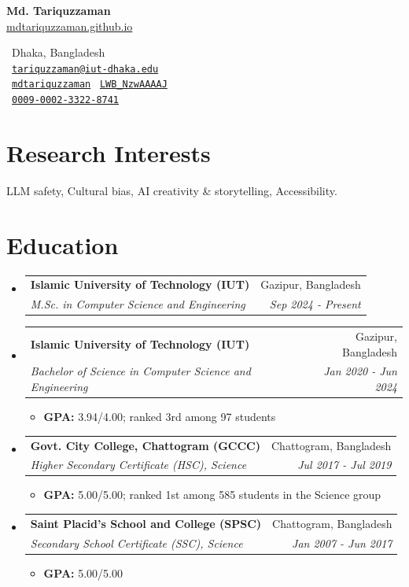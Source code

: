 \documentclass[letterpaper,11pt]{article}
\makeatletter
\newcommand{\cvEntry}[4]{\item
  \begin{tabular*}{\linewidth}{@{}l@{\extracolsep{\fill}}r@{}}
    \textbf{#1} & #2\\
    {\small\textit{#3}} & {\small\textit{#4}}
  \end{tabular*}}
\newenvironment{entries}{\vspace{-1.35pt}\begin{itemize}[leftmargin=14bp,label=\textbullet,itemsep=5.75pt,topsep=0pt,parsep=0pt]}{\end{itemize}}
\newenvironment{details}{\begin{itemize}[leftmargin=24bp,label=$\circ$,itemsep=2pt,topsep=4pt,parsep=0pt]\small}{\end{itemize}}
\makeatother
\begin{document}
\noindent
\begin{minipage}[t]{0.47\textwidth}
  \vspace{6.55bp}
  {\fontsize{20.74pt}{24pt}\selectfont\bfseries Md. Tariquzzaman}\\[3pt]
  \href{https://mdtariquzzaman.github.io}{mdtariquzzaman.github.io}
\end{minipage}\hfill
\begin{minipage}[t]{0.53\textwidth}
  \vspace{0pt}\raggedleft
  \ Dhaka, Bangladesh\\
  \ \href{mailto:tariquzzaman@iut-dhaka.edu}{\texttt{tariquzzaman@iut-dhaka.edu}}\\
  \faGithub\ \href{https://github.com/mdtariquzzaman}{\texttt{mdtariquzzaman}}
  \quad\aiGoogleScholar\ \href{https://scholar.google.com/citations?user=LWB_NzwAAAAJ}{\texttt{LWB\_NzwAAAAJ}}\\
  \aiOrcid\ \href{https://orcid.org/0009-0002-3322-8741}{\texttt{0009-0002-3322-8741}}
\end{minipage}
\vspace{-3.1pt}

\section{Research Interests}
LLM safety, Cultural bias, AI creativity \& storytelling, Accessibility.

\section{Education}
\begin{entries}
  \cvEntry{Islamic University of Technology (IUT)}{Gazipur, Bangladesh}
    {M.Sc. in Computer Science and Engineering}{Sep 2024 - Present}
  \cvEntry{Islamic University of Technology (IUT)}{Gazipur, Bangladesh}
    {Bachelor of Science in Computer Science and Engineering}{Jan 2020 - Jun 2024}
  \begin{details}
    \item \textbf{GPA:} 3.94/4.00; ranked 3rd among 97 students
  \end{details}
  \cvEntry{Govt. City College, Chattogram (GCCC)}{Chattogram, Bangladesh}
    {Higher Secondary Certificate (HSC), Science}{Jul 2017 - Jul 2019}
  \begin{details}
    \item \textbf{GPA:} 5.00/5.00; ranked 1st among 585 students in the Science group
  \end{details}
  \cvEntry{Saint Placid's School and College (SPSC)}{Chattogram, Bangladesh}
    {Secondary School Certificate (SSC), Science}{Jan 2007 - Jun 2017}
  \begin{details}
    \item \textbf{GPA:} 5.00/5.00
  \end{details}
\end{entries}
\end{document}
